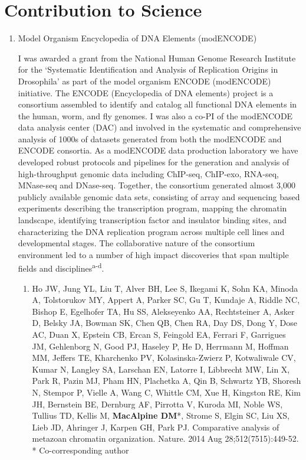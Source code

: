 \documentclass{nihbiosketch}
\begin{document}
\section{Contribution to Science}

\begin{enumerate}


\item Model Organism Encyclopedia of DNA Elements (modENCODE)

I was awarded a grant from the National Human Genome Research Institute for the ‘Systematic Identification and Analysis of Replication Origins in Drosophila’ as part of the model organism ENCODE (modENCODE) initiative. The ENCODE (Encyclopedia of DNA elements) project is a consortium assembled to identify and catalog all functional DNA elements in the human, worm, and fly genomes. I was also a co-PI of the modENCODE data analysis center (DAC) and involved in the systematic and comprehensive analysis of 1000s of datasets generated from both the modENCODE and ENCODE consortia.  As a modENCODE data production laboratory we have developed robust protocols and pipelines for the generation and analysis of high-throughput genomic data including ChIP-seq, ChIP-exo, RNA-seq, MNase-seq and DNase-seq.  Together, the consortium generated almost 3,000 publicly available genomic data sets, consisting of array and sequencing based experiments describing the transcription program, mapping the chromatin landscape, identifying transcription factor and insulator binding sites, and characterizing the DNA replication program across multiple cell lines and developmental stages.  The collaborative nature of the consortium environment led to a number of high impact discoveries that span multiple fields and disciplines\textsuperscript{a-d}.

  
\begin{enumerate}
\setlength\itemsep{0.35em}

\item Ho JW, Jung YL, Liu T, Alver BH, Lee S, Ikegami K, Sohn KA, Minoda A, Tolstorukov MY, Appert A, Parker SC, Gu T, Kundaje A, Riddle NC, Bishop E, Egelhofer TA, Hu SS, Alekseyenko AA, Rechtsteiner A, Asker D, Belsky JA, Bowman SK, Chen QB, Chen RA, Day DS, Dong Y, Dose AC, Duan X, Epstein CB, Ercan S, Feingold EA, Ferrari F, Garrigues JM, Gehlenborg N, Good PJ, Haseley P, He D, Herrmann M, Hoffman MM, Jeffers TE, Kharchenko PV, Kolasinska-Zwierz P, Kotwaliwale CV, Kumar N, Langley SA, Larschan EN, Latorre I, Libbrecht MW, Lin X, Park R, Pazin MJ, Pham HN, Plachetka A, Qin B, Schwartz YB, Shoresh N, Stempor P, Vielle A, Wang C, Whittle CM, Xue H, Kingston RE, Kim JH, Bernstein BE, Dernburg AF, Pirrotta V, Kuroda MI, Noble WS, Tullius TD, Kellis M, \textbf{MacAlpine DM}*, Strome S, Elgin SC, Liu XS, Lieb JD, Ahringer J, Karpen GH, Park PJ. Comparative analysis of metazoan chromatin organization. Nature. 2014 Aug 28;512(7515):449-52. * Co-corresponding author


\end{enumerate}
\end{enumerate}
\end{document}
